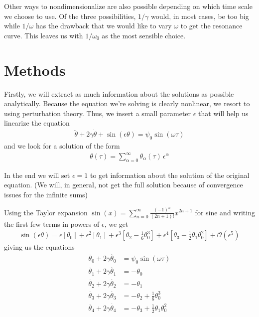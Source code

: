\documentclass[12pt,a4paper]{article}
\begin{document}
Other ways to nondimensionalize are also possible depending on which time scale we choose to use. Of the three possibilities, $1/\gamma$ would, in most cases, be too big while $1/\omega$ has the drawback that we would like to vary $\omega$ to get the resonance curve. This leaves us with $1/\omega_0$ as the most sensible choice.


\section{Methods}

Firstly, we will extract as much information about the solutions as possible analytically. Because the equation we're solving is clearly nonlinear, we resort to using perturbation theory. Thus, we insert a small parameter $\epsilon$ that will help us linearize the equation
%
\begin{align}
\ddot{\theta} + 2\gamma \dot{\theta} + \sin(\epsilon \theta) = \psi_0 \sin(\omega \tau)
\end{align}
%
and we look for a solution of the form
%
\begin{align}
\theta(\tau) = \sum_{\alpha=0}^{\infty} \theta_{\alpha}(\tau) \, \epsilon^{\alpha}
\end{align}

In the end we will set $\epsilon = 1$ to get information about the solution of the original equation. (We will, in general, not get the full solution because of convergence issues for the infinite sums)

Using the Taylor expansion $\sin(x) = \sum_{n=0}^{\infty} \frac{(-1)^n}{(2n+1)!} x^{2n+1}$ for sine and writing the first few terms in powers of $\epsilon$, we get
%
\begin{align}
\sin(\epsilon \theta) = \epsilon \left[\theta_0\right] + \epsilon^2 \left[\theta_1\right] + \epsilon^3 \left[\theta_2 - \frac{1}{6} \theta_0^3\right] + \epsilon^4 \left[\theta_3 - \frac{1}{2}\theta_1\theta_0^2\right] + \mathcal{O}(\epsilon^5)
\end{align}
%
giving us the equations
%
\begin{align}
\ddot{\theta_0} + 2\gamma \dot{\theta_0} &= \psi_0 \sin(\omega \tau) \\
\ddot{\theta_1} + 2\gamma \dot{\theta_1} &= -\theta_0 \\
\ddot{\theta_2} + 2\gamma \dot{\theta_2} &= -\theta_1 \\
\ddot{\theta_3} + 2\gamma \dot{\theta_3} &= -\theta_2 + \frac{1}{6}\theta_0^3 \\
\ddot{\theta_4} + 2\gamma \dot{\theta_4} &= -\theta_3 + \frac{1}{2}\theta_1\theta_0^2
\end{align}
\end{document}
